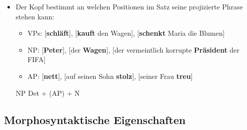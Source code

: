 \begin{frame}

\begin{itemize}
	\item Der Kopf bestimmt an welchen Positionen im Satz seine projizierte Phrase stehen kann:
	\begin{itemize}
		\item VPs: [\textbf{schläft}], [\textbf{kauft} den Wagen], [\textbf{schenkt} Maria die Blumen]
		\item NP: [\textbf{Peter}], [der \textbf{Wagen}], [der vermeintlich korrupte \textbf{Präsident} der FIFA]
		\item AP: [\textbf{nett}], [auf seinen Sohn \textbf{stolz}], [seiner Frau \textbf{treu}]
\end{itemize}
	\pause

\eal NP \ras Det + (AP) + N
\zl
	
	
\end{itemize}

\end{frame}

\subsection{Morphosyntaktische Eigenschaften}

